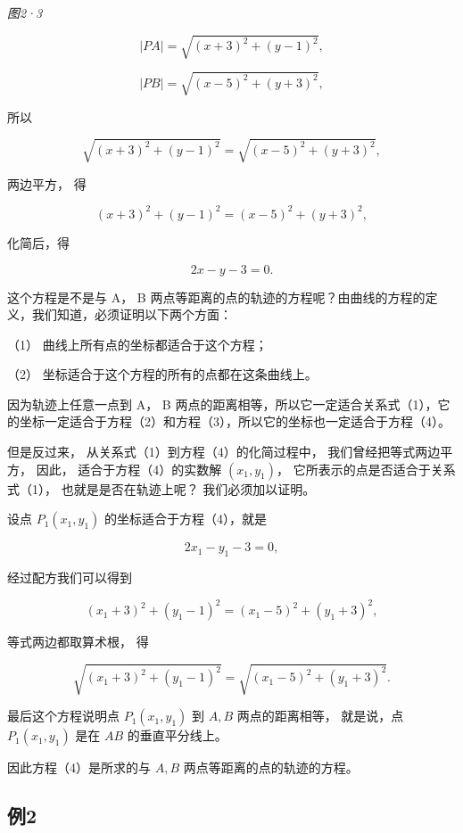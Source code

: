 \emph{图2·3}

\[
\left| PA \right| = \sqrt {(x + 3) ^ {2} + (y - 1) ^ {2}},
\]

\[
\left| PB \right| = \sqrt {(x - 5) ^ {2} + (y + 3) ^ {2}},
\]

所以

\[
\sqrt {(x + 3) ^ {2} + (y - 1) ^ {2}} = \sqrt {(x - 5) ^ {2} + (y + 3) ^ {2}}, \tag {2}
\]

两边平方， 得

\[
(x + 3) ^ {2} + (y - 1) ^ {2} = (x - 5) ^ {2} + (y + 3) ^ {2}, \tag {3}
\]

化简后，得

\[
2 x - y - 3 = 0. \tag {4}
\]

这个方程是不是与 A， B
两点等距离的点的轨迹的方程呢？由曲线的方程的定义，我们知道，必须证明以下两个方面：

（1） 曲线上所有点的坐标都适合于这个方程；

（2） 坐标适合于这个方程的所有的点都在这条曲线上。

因为轨迹上任意一点到 A， B
两点的距离相等，所以它一定适合关系式（1），它的坐标一定适合于方程（2）和方程（3），所以它的坐标也一定适合于方程（4）。

但是反过来， 从关系式（1）到方程（4）的化简过程中，
我们曾经把等式两边平方， 因此， 适合于方程（4）的实数解
\((x_{1}, y_{1})\)， 它所表示的点是否适合于关系式（1），
也就是是否在轨迹上呢？ 我们必须加以证明。

设点 \(P_{1}(x_{1},y_{1})\) 的坐标适合于方程（4），就是

\[
2 x_{1} - y_{1} - 3 = 0,
\]

经过配方我们可以得到

\[
(x_{1} + 3) ^ {2} + (y_{1} - 1) ^ {2} = (x_{1} - 5) ^ {2} + (y_{1} + 3) ^ {2},
\]

等式两边都取算术根， 得

\[
\sqrt {\left(x_{1} + 3\right) ^ {2} + \left(y_{1} - 1\right) ^ {2}} = \sqrt {\left(x_{1} - 5\right) ^ {2} + \left(y_{1} + 3\right) ^ {2}}.
\]

最后这个方程说明点 \(P_{1}(x_{1},y_{1})\) 到 \(A,B\) 两点的距离相等，
就是说，点 \(P_{1}(x_{1}, y_{1})\) 是在 \(AB\) 的垂直平分线上。

因此方程（4）是所求的与 \(A, B\) 两点等距离的点的轨迹的方程。

\subsection{例2}\label{ux4f8b2-7}


